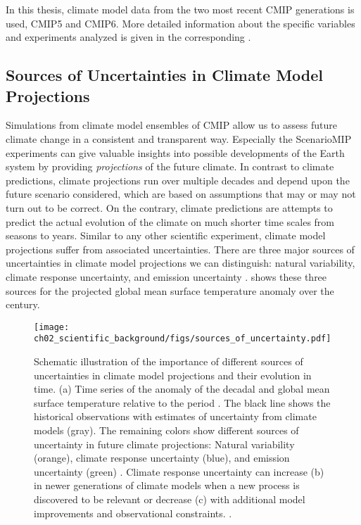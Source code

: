 In this thesis, climate model data from the two most recent \ac{CMIP}
generations is used, \acs{CMIP}5 and \acs{CMIP}6. More detailed information
about the specific variables and experiments analyzed is given in the
corresponding .


\subsection{Sources of Uncertainties in Climate Model Projections}
\label{subsec:02:source_of_uncertainties}

Simulations from climate model ensembles of \ac{CMIP} allow us to assess future
climate change in a consistent and transparent way. Especially the
\ac{ScenarioMIP} experiments can give valuable insights into possible
developments of the Earth system by providing \emph{projections} of the future
climate. In contrast to climate predictions, climate projections run over
multiple decades and depend upon the future scenario considered, which are
based on assumptions that may or may not turn out to be correct. On the
contrary, climate predictions are attempts to predict the actual evolution of
the climate on much shorter time scales from seasons to years. Similar to any
other scientific experiment, climate model projections suffer from associated
uncertainties. There are three major sources of uncertainties in climate model
projections we can distinguish: natural variability, climate response
uncertainty, and emission uncertainty \autocite{Hawkins2009, Hawkins2010}.
 shows these three sources for the
projected global mean surface temperature anomaly over the  century.

\begin{figure}[t]
  \centering
  \texttt{[image: 
    ch02\_scientific\_background/figs/sources\_of\_uncertainty.pdf]}
  \caption[
    Schematic illustration of the importance of different sources of
    uncertainties in climate model projections and their evolution in time.
  ]{
    Schematic illustration of the importance of different sources of
    uncertainties in climate model projections and their evolution in time. (a)
    Time series of the anomaly of the decadal and global mean surface
    temperature relative to the period . The black line shows
    the historical observations with estimates of uncertainty from climate
    models (gray). The remaining colors show different sources of uncertainty
    in future climate projections: Natural variability (orange), climate
    response uncertainty (blue), and emission uncertainty (green)
    \autocite{Hawkins2009, Hawkins2010}. Climate response uncertainty can
    increase (b) in newer generations of climate models when a new process is
    discovered to be relevant or decrease (c) with additional model
    improvements and observational constraints.
    .
  }
  \label{fig:02:sources_of_uncertainty}
\end{figure}

